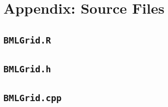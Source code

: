 \documentclass{article}
\begin{document}
\pagebreak
\section*{Appendix: Source Files}
\subsection*{\texttt{BMLGrid.R}}

\subsection*{\texttt{BMLGrid.h}}

\subsection*{\texttt{BMLGrid.cpp}}



\end{document}
